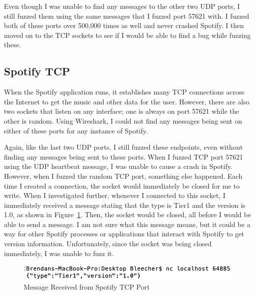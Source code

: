 Even though I was unable to find any messages to the other two UDP ports, I still fuzzed them using the same messages that I fuzzed port 57621 with.  I fuzzed both of these ports over 500,000 times as well and never crashed Spotify.  I then moved on to the TCP sockets to see if I would be able to find a bug while fuzzing these.

\subsection{Spotify TCP}
\label{sec:spotifyTcp}
When the Spotify application runs, it establishes many TCP connections across the Internet to get the music and other data for the user.  However, there are also two sockets that listen on any interface; one is always on port 57621 while the other is random.  Using Wireshark, I could not find any messages being sent on either of these ports for any instance of Spotify.

Again, like the last two UDP ports, I still fuzzed these endpoints, even without finding any messages being sent to these ports.  When I fuzzed TCP port 57621 using the UDP heartbeat message, I was unable to cause a crash in Spotify.  However, when I fuzzed the random TCP port, something else happened.  Each time I created a connection, the socket would immediately be closed for me to write.  When I investigated further, whenever I connected to this socket, I immediately received a message stating that the type is Tier1 and the version is 1.0, as shown in Figure~\ref{fig:spotifyTcpResponse}.  Then, the socket would be closed, all before I would be able to send a message.  I am not sure what this message means, but it could be a way for other Spotify processes or applications that interact with Spotify to get version information.  Unfortunately, since the socket was being closed immediately, I was unable to fuzz it.

\begin{figure}
\centering
\includegraphics[width=1\textwidth]{spotifyMessage.png}
\caption{Message Received from Spotify TCP Port}
\label{fig:spotifyTcpResponse}
\end{figure}

